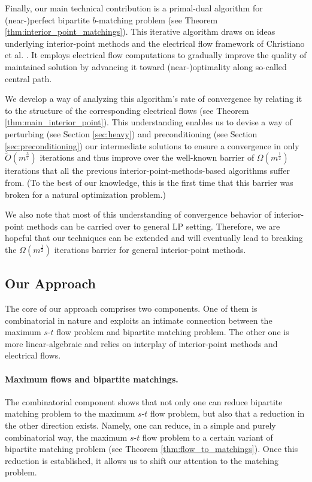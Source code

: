 \documentclass[11pt, letterpaper]{article}
\newcommand{\tO}[1]{\widetilde{O}(#1)}
\newcommand{\bb}{\boldsymbol{\mathit{b}}}
\begin{document}
Finally, our main technical contribution is a primal-dual algorithm for {(near-)}perfect bipartite $\bb$-matching problem (see Theorem \ref{thm:interior_point_matchings}). This iterative algorithm draws on ideas underlying interior-point methods and the electrical flow framework of Christiano et al. \cite{ChristianoKMST11}. It employs electrical flow computations to gradually improve the quality of maintained solution by advancing it toward (near-)optimality along so-called central path. 

We develop a way of analyzing this algorithm's rate of convergence by relating it to the structure of the corresponding electrical flows (see Theorem \ref{thm:main_interior_point}). This understanding enables us to devise a way of perturbing (see Section \ref{sec:heavy}) and preconditioning (see Section \ref{sec:preconditioning}) our intermediate solutions to ensure a convergence in only $\tO{m^{\frac{3}{7}}}$ iterations and thus improve over the well-known barrier of $\Omega(m^{\frac{1}{2}})$ iterations that all the previous interior-point-methods-based algorithms suffer from. (To the best of our knowledge, this is the first time that this barrier was broken for a natural optimization problem.) 

We also note that most of this understanding of convergence behavior of interior-point methods can be carried over to general LP setting. Therefore, we are hopeful that our techniques can be extended and will eventually lead to breaking the $\Omega(m^{\frac{1}{2}})$ iterations barrier for general interior-point methods.

\subsection{Our Approach}

The core of our approach comprises two components. One of them is combinatorial in nature and exploits an intimate connection between the maximum $s$-$t$ flow problem and  bipartite matching problem. The other one is more linear-algebraic and relies on interplay of interior-point methods and electrical flows. 

\paragraph{Maximum flows and bipartite matchings.} The combinatorial component shows that not only one can reduce bipartite matching problem to the maximum $s$-$t$ flow problem, but also that a reduction in the other direction exists. Namely, one can reduce, in a simple and purely combinatorial way, the maximum $s$-$t$ flow problem to a certain variant of bipartite matching problem (see Theorem \ref{thm:flow_to_matchings}). Once this reduction is established, it allows us to shift our attention to the matching problem. 
\end{document}
